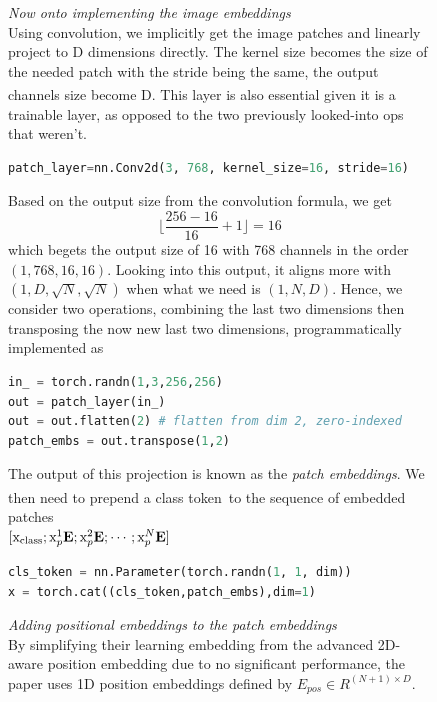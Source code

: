\documentclass[12pt]{article}
\newcommand{\customtext}[3]{%
    \vspace{#2} %
    \fontsize{13}{8}\textcolor{#1}{\textit{#3}}%
}
\newcommand{\sidecite}[1]{\textsuperscript{\textcolor{blue}{\textbf{\scriptsize#1}}}}
\newcommand{\customtitle}[1]{\fontsize{14}{8}\textcolor{xtitle}{\textit{#1}}\\}
\newcommand{\maincitecount}{\sidecite{\stepcounter{maincite}\themaincite}}
\begin{document}
\begin{figure}[!htb]
\begin{minipage}[t]{0.65\textwidth}
\raggedright
\customtitle{Now onto implementing the image embeddings}
Using convolution, we implicitly get the image patches and linearly project to D dimensions
directly.
The kernel size becomes the size of the needed patch with the stride being the same, 
the output channels size become D\maincitecount. This layer is also essential given it is 
a trainable layer, as opposed to the two previously looked-into ops that weren't.
\begin{lstlisting}[language=python,style=python,basicstyle=\ttfamily\footnotesize]
patch_layer=nn.Conv2d(3, 768, kernel_size=16, stride=16)
\end{lstlisting}
Based on the output size from the convolution formula, we get  
$$\Big\lfloor \frac{256 - 16}{16} + 1 \Big\rfloor=16$$
which begets the output size of 16  with 768 channels in the order 
{\small $(1,768,16,16)$}. Looking into this output, it aligns more with 
{\small $(1,D,\sqrt{N},\sqrt{N})$} when what we need is {\small $(1,N,D)$}.
Hence, we consider two operations, combining the last two dimensions then transposing 
the now new last two dimensions, programmatically implemented as\\ 
\begin{lstlisting}[language=python,style=python,basicstyle=\ttfamily\footnotesize]
in_ = torch.randn(1,3,256,256)
out = patch_layer(in_)
out = out.flatten(2) # flatten from dim 2, zero-indexed
patch_embs = out.transpose(1,2)
\end{lstlisting}
The output of this projection is known as the {\it \color{xtitle} patch embeddings}.
We then need to prepend a class token\maincitecount\ to the sequence of embedded patches\\
$[\text{x}_{\text{class}};\text{x}_p^1\text{\bf E};\text{x}_p^2\text{\bf E};\cdots;\text{x}_p^N\text{\bf E}]$
\begin{lstlisting}[language=python,style=python,basicstyle=\ttfamily\footnotesize]
cls_token = nn.Parameter(torch.randn(1, 1, dim))
x = torch.cat((cls_token,patch_embs),dim=1)
\end{lstlisting}
\customtext{xtitle}{0em}{Adding positional embeddings to the patch embeddings}\\
By simplifying their learning embedding from the advanced 2D-aware position 
embedding due to no significant performance, the paper uses 1D position embeddings
defined by {\small $E_{pos}\in R^{(N+1)\times D}$}.
\begin{lstlisting}[language=python,style=python,basicstyle=\ttfamily\footnotesize]

\end{lstlisting}
\end{minipage}
\end{figure}
\end{document}
